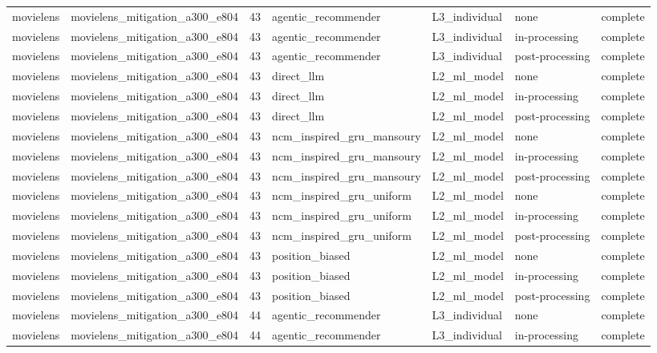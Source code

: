 \begin{table}[htbp!]
\begin{tabular}{llrllll}
movielens & movielens\_mitigation\_a300\_e804 & 43 & agentic\_recommender & L3\_individual & none & complete \\
movielens & movielens\_mitigation\_a300\_e804 & 43 & agentic\_recommender & L3\_individual & in-processing & complete \\
movielens & movielens\_mitigation\_a300\_e804 & 43 & agentic\_recommender & L3\_individual & post-processing & complete \\
movielens & movielens\_mitigation\_a300\_e804 & 43 & direct\_llm & L2\_ml\_model & none & complete \\
movielens & movielens\_mitigation\_a300\_e804 & 43 & direct\_llm & L2\_ml\_model & in-processing & complete \\
movielens & movielens\_mitigation\_a300\_e804 & 43 & direct\_llm & L2\_ml\_model & post-processing & complete \\
movielens & movielens\_mitigation\_a300\_e804 & 43 & ncm\_inspired\_gru\_mansoury & L2\_ml\_model & none & complete \\
movielens & movielens\_mitigation\_a300\_e804 & 43 & ncm\_inspired\_gru\_mansoury & L2\_ml\_model & in-processing & complete \\
movielens & movielens\_mitigation\_a300\_e804 & 43 & ncm\_inspired\_gru\_mansoury & L2\_ml\_model & post-processing & complete \\
movielens & movielens\_mitigation\_a300\_e804 & 43 & ncm\_inspired\_gru\_uniform & L2\_ml\_model & none & complete \\
movielens & movielens\_mitigation\_a300\_e804 & 43 & ncm\_inspired\_gru\_uniform & L2\_ml\_model & in-processing & complete \\
movielens & movielens\_mitigation\_a300\_e804 & 43 & ncm\_inspired\_gru\_uniform & L2\_ml\_model & post-processing & complete \\
movielens & movielens\_mitigation\_a300\_e804 & 43 & position\_biased & L2\_ml\_model & none & complete \\
movielens & movielens\_mitigation\_a300\_e804 & 43 & position\_biased & L2\_ml\_model & in-processing & complete \\
movielens & movielens\_mitigation\_a300\_e804 & 43 & position\_biased & L2\_ml\_model & post-processing & complete \\
movielens & movielens\_mitigation\_a300\_e804 & 44 & agentic\_recommender & L3\_individual & none & complete \\
movielens & movielens\_mitigation\_a300\_e804 & 44 & agentic\_recommender & L3\_individual & in-processing & complete \\

\end{tabular}
\end{table}
